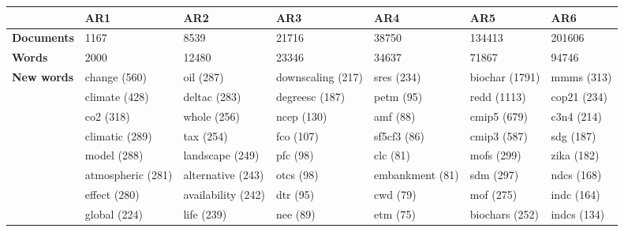 \begin{tabular}{l p{1.8cm} p{1.8cm} p{1.8cm} p{1.8cm} p{1.8cm} p{1.8cm}} 
&\textbf{AR1} & \textbf{AR2} & \textbf{AR3} & \textbf{AR4} & \textbf{AR5} & \textbf{AR6}\\ \hline\textbf{Documents} &1167 & 8539 & 21716 & 38750 & 134413 & 201606\\ 
\textbf{Words} &2000 & 12480 & 23346 & 34637 & 71867 & 94746\\ 
\textbf{New words} & change (560) & oil (287) & downscaling (217) & sres (234) & biochar (1791) & mmms (313)\\ & climate (428) & deltac (283) & degreesc (187) & petm (95) & redd (1113) & cop21 (234)\\ & co2 (318) & whole (256) & ncep (130) & amf (88) & cmip5 (679) & c3n4 (214)\\ & climatic (289) & tax (254) & fco (107) & sf5cf3 (86) & cmip3 (587) & sdg (187)\\ & model (288) & landscape (249) & pfc (98) & clc (81) & mofs (299) & zika (182)\\ & atmospheric (281) & alternative (243) & otcs (98) & embankment (81) & sdm (297) & ndcs (168)\\ & effect (280) & availability (242) & dtr (95) & cwd (79) & mof (275) & indc (164)\\ & global (224) & life (239) & nee (89) & etm (75) & biochars (252) & indcs (134)
\end{tabular}